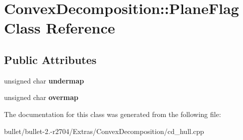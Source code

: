 \hypertarget{class_convex_decomposition_1_1_plane_flag}{\section{Convex\+Decomposition\+:\+:Plane\+Flag Class Reference}
\label{class_convex_decomposition_1_1_plane_flag}
}
\subsection*{Public Attributes}
\begin{DoxyCompactItemize}
\item 
\hypertarget{class_convex_decomposition_1_1_plane_flag_a7126be5891c96dffdbf1b36365ec2ec3}{unsigned char {\bfseries undermap}}\label{class_convex_decomposition_1_1_plane_flag_a7126be5891c96dffdbf1b36365ec2ec3}

\item 
\hypertarget{class_convex_decomposition_1_1_plane_flag_ae64eb29be586392df005ca9957055c10}{unsigned char {\bfseries overmap}}\label{class_convex_decomposition_1_1_plane_flag_ae64eb29be586392df005ca9957055c10}

\end{DoxyCompactItemize}


The documentation for this class was generated from the following file\+:\begin{DoxyCompactItemize}
\item 
bullet/bullet-\/2.-\/r2704/\+Extras/\+Convex\+Decomposition/cd\+\_\+hull.\+cpp\end{DoxyCompactItemize}
